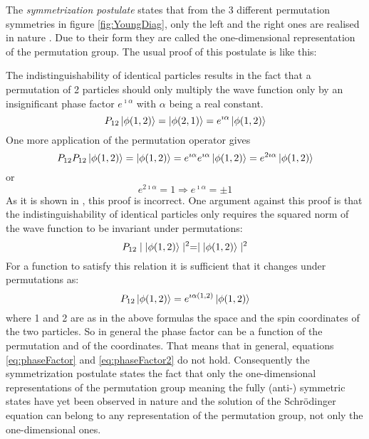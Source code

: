 The \textit{symmetrization postulate} states that from the 3 different permutation symmetries in figure \ref{fig:YoungDiag}, only the left and the right ones are realised in nature \cite{Messiah1964}. Due to their form they are called the one-dimensional representation of the permutation group. The usual proof of this postulate is like this:

The indistinguishability of identical particles results in the fact that a permutation of 2 particles should only multiply the wave function only by an insignificant phase factor $e^{\imath\alpha}$ with $\alpha$ being a real constant.
\begin{equation}
 P_{12}\ket{\phi(1,2)} = \ket{\phi(2,1)} = e^{\imath\alpha}\ket{\phi(1,2)}
\end{equation} 
One more application of the permutation operator gives
\begin{equation}
\label{eq:phaseFactor}
 P_{12}P_{12}\ket{\phi(1,2)} =  \ket{\phi(1,2)} = e^{\imath\alpha}e^{\imath\alpha}\ket{\phi(1,2)} = e^{2\imath\alpha}\ket{\phi(1,2)}
\end{equation} 
or
\begin{equation}
\label{eq:phaseFactor2}
 e^{2\imath\alpha} = 1 \Rightarrow e^{\imath\alpha} = \pm 1
\end{equation} 
As it is shown in \cite{Kaplan2013}, this proof is incorrect. One argument against this proof is that the indistinguishability of identical particles only requires the squared norm of the wave function to be invariant under permutations:
\begin{equation}
 P_{12}\mid\ket{\phi(1,2)}\mid^{2} = \mid\ket{\phi(1,2)}\mid^{2}
\end{equation} 
For a function to satisfy this relation it is sufficient that it changes under permutations as:
\begin{equation}
 P_{12}\ket{\phi(1,2)} = e^{\imath\alpha(1,2)}\ket{\phi(1,2)}
\end{equation} 
where 1 and 2 are as in the above formulas the space and the spin coordinates of the two particles. So in general the phase factor can be a function of the permutation and of the coordinates. That means that in general, equations \ref{eq:phaseFactor} and \ref{eq:phaseFactor2} do not hold. Consequently the symmetrization postulate states the fact that only the one-dimensional representations of the permutation group meaning the fully (anti-) symmetric states have yet been observed in nature and the solution of the Schrödinger equation can belong to any representation of the permutation group, not only the one-dimensional ones.

